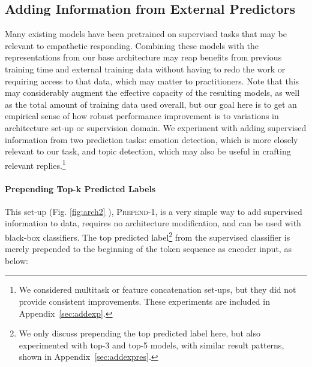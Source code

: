 \documentclass[11pt,a4paper]{article}
\begin{document}



\subsection{Adding Information from External Predictors}
\label{sec:explicit}

Many existing models have been pretrained on supervised tasks that
may be relevant to empathetic responding. %
Combining these models with the representations from our
base architecture may reap benefits from previous training time
and external training data without having to redo the work or requiring access to that data, which may matter to practitioners.
Note that this may considerably augment the effective 
capacity of the resulting models, as well as the total
amount of training data used overall, but %
our goal here is to get an empirical sense of how robust performance improvement is to variations in architecture set-up or supervision domain.
We experiment with adding supervised information from two prediction tasks: emotion detection, which is more closely relevant to our task, and topic detection, which may also be useful in crafting relevant replies.\footnote{We considered multitask or feature concatenation set-ups, but they did not provide consistent improvements. These experiments are included in Appendix~\ref{sec:addexp}.}



\paragraph{Prepending Top-k Predicted Labels}
This set-up (Fig. \ref{fig:arch2}%
), \textsc{Prepend-1}, is a very simple way to add
supervised information to data, requires no architecture modification, and can be used with black-box classifiers.
The top predicted label\footnote{We only discuss prepending the top predicted label here, but also experimented with top-3 and top-5 models, with similar result patterns, shown in Appendix~\ref{sec:addexpres}.} from the supervised classifier
is merely prepended to the beginning of the token sequence as encoder input, as below:
\end{document}
